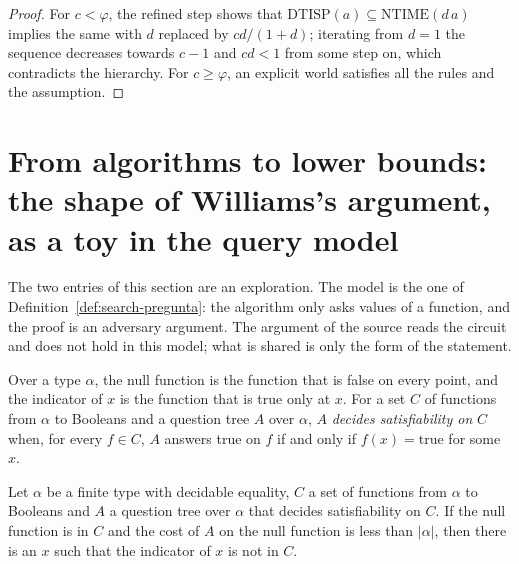 \begin{proof}
  \leanok
  For $c < \varphi$, the refined step shows that $\mathrm{DTISP}(a) \subseteq \mathrm{NTIME}(d\,a)$
  implies the same with $d$ replaced by $c d / (1 + d)$; iterating from $d = 1$ the sequence
  decreases towards $c - 1$ and $c d < 1$ from some step on, which contradicts the hierarchy. For
  $c \ge \varphi$, an explicit world satisfies all the rules and the assumption.
\end{proof}

\section{From algorithms to lower bounds: the shape of Williams's argument, as a toy in the query model}
\label{sec:search-algorithms-bounds}

The two entries of this section are an exploration. The model is the one of
Definition~\ref{def:search-pregunta}: the algorithm only asks values of a function, and the proof is
an adversary argument. The argument of the source reads the circuit and does not hold in this
model; what is shared is only the form of the statement.

\begin{definition}
  \label{def:search-sat-clase}
  \leanok
  Over a type $\alpha$, the null function is the function that is false on every point, and the
  indicator of $x$ is the function that is true only at $x$. For a set $C$ of functions from
  $\alpha$ to Booleans and a question tree $A$ over $\alpha$, $A$ \emph{decides satisfiability on}
  $C$ when, for every $f \in C$, $A$ answers true on $f$ if and only if $f(x) = \mathrm{true}$ for some
  $x$.
  \own{}
  \exploration{}
\end{definition}

\begin{theorem}
  \label{thm:search-algoritmo-implica-cota}
  \leanok
  Let $\alpha$ be a finite type with decidable equality, $C$ a set of functions from $\alpha$ to
  Booleans and $A$ a question tree over $\alpha$ that decides satisfiability on $C$. If the null
  function is in $C$ and the cost of $A$ on the null function is less than $|\alpha|$, then there is
  an $x$ such that the indicator of $x$ is not in $C$.
  \own{}
  \exploration{}
\end{theorem}

